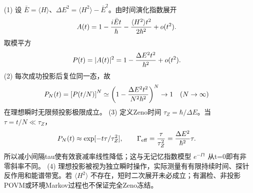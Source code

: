 (1) 设 \(\bar E=\langle H\rangle\)、\(\Delta E^2=\langle H^2\rangle-\bar E^2\)。由时间演化指数展开
\[
A(t)=1-{i\bar Et\over\hbar}-{\langle H^2\rangle t^2\over2\hbar^2}+o(t^2).
\]
取模平方
\[
P(t)=|A(t)|^2=1-{\Delta E^2t^2\over\hbar^2}+o(t^2).
\]
(2) 每次成功投影后复位同一态，故
\[
P_N(t)=\left[P(t/N)\right]^N
\simeq\left(1-{\Delta E^2t^2\over N^2\hbar^2}\right)^N
\to1 \quad(N\to\infty)
\]
在理想瞬时无限频投影极限成立。
(3) 定义Zeno时间 \(\tau_Z=\hbar/\Delta E\)。当 \(\tau=t/N\ll\tau_Z\)，
\[
P_N(t)\approx\exp[-t\tau/\tau_Z^2],\qquad
\Gamma_\mathrm{eff}={\tau\over\tau_Z^2}={\Delta E^2\over\hbar^2}\tau.
\]
所以减小间隔tau使有效衰减率线性降低；这与无记忆指数模型 \(e^{-\Gamma t}\) 从t=0即有非零斜率不同。
(4) 理想投影被视为独立瞬时操作，实际测量有有限持续时间、探针反作用和能谱带宽。若 \(\langle H^2\rangle\) 不存在，短时二次展开未必成立；有漏检、非投影POVM或环境Markov过程也不保证完全Zeno冻结。
